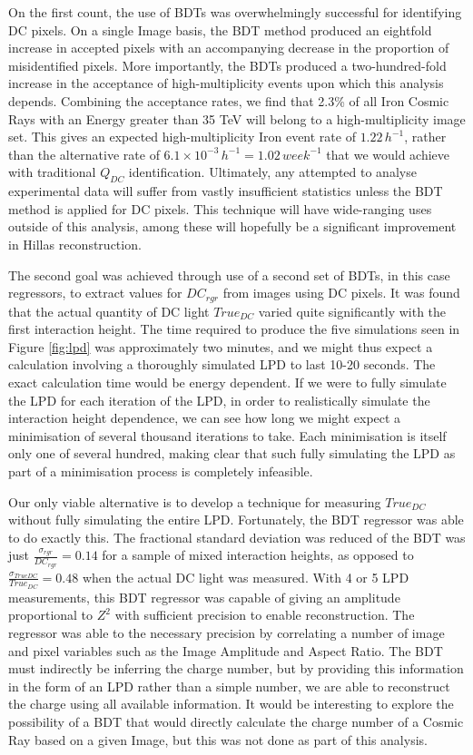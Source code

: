 \documentclass[11pt]{article}
\begin{document}
On the first count, the use of BDTs was overwhelmingly successful for identifying DC pixels. On a single Image basis, the BDT method produced an eightfold increase in accepted pixels with an accompanying decrease in the proportion of misidentified pixels. More importantly, the BDTs produced a two-hundred-fold increase in the acceptance of high-multiplicity events upon which this analysis depends. Combining the acceptance rates, we find that 2.3\% of all Iron Cosmic Rays with an Energy greater than 35 TeV will belong to a high-multiplicity image set. This gives an expected high-multiplicity Iron event rate of $1.22 \, h^{-1}$, rather than the alternative rate of $6.1 \times 10 ^{-3} \, h^{-1}= 1.02 \, week^{-1}$ that we would achieve with traditional $Q_{DC}$ identification. Ultimately, any attempted to analyse experimental data will suffer from vastly insufficient statistics unless the BDT method is applied for DC pixels. This technique will have wide-ranging uses outside of this analysis, among these will hopefully be a significant improvement in Hillas reconstruction. 

The second goal was achieved through use of a second set of BDTs, in this case regressors, to extract values for $DC_{rgr}$ from images using DC pixels. It was found that the actual quantity of DC light $True_{DC}$ varied quite significantly with the first interaction height. The time required to produce the five simulations seen in Figure \ref{fig:lpd} was approximately two minutes, and we might thus expect a calculation involving a thoroughly simulated LPD to last 10-20 seconds. The exact calculation time would be energy dependent. If we were to fully simulate the LPD for each iteration of the LPD, in order to realistically simulate the interaction height dependence,  we can see how long we might expect a minimisation of several thousand iterations to take. Each minimisation is itself only one of several hundred, making clear that such  fully simulating the LPD as part of a minimisation process is completely infeasible. 

Our only viable alternative is to develop a technique for measuring $True_{DC}$ without fully simulating the entire LPD. Fortunately, the BDT regressor was able to  do exactly this. The fractional standard deviation was reduced of the BDT was just $\frac{\sigma_{rgr}}{DC_{rgr}} = 0.14$ for a sample of mixed interaction heights, as opposed to $\frac{\sigma_{TrueDC}}{True_{DC}} = 0.48$ when the actual DC light was measured. With 4 or 5 LPD measurements, this BDT regressor was capable of giving an amplitude proportional to $Z^{2}$ with sufficient precision to enable reconstruction. The regressor was able to the necessary precision by correlating a number of image and pixel variables such as the Image Amplitude and Aspect Ratio. The BDT must indirectly be inferring the charge number, but by providing this information in the form of an LPD rather than a simple number, we are able to reconstruct the charge using all available information. It would be interesting to explore the possibility of a BDT that would directly calculate the charge number of a Cosmic Ray based on a given Image, but this was not done as part of this analysis.
\end{document}
